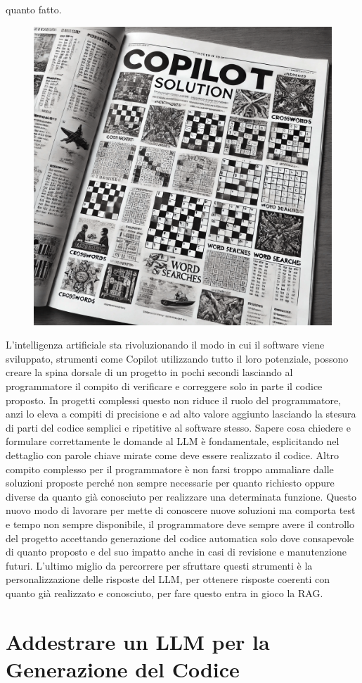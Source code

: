 \documentclass[12pt,a4paper,openright,twoside]{book}
\begin{document}
quanto fatto.
\begin{figure}[h]
    \centering
    \includegraphics[width=0.5\linewidth]{figures/copilotsolutionSettimanaEnigmistica.png}
    \label{fig:Copilot-Solution}
\end{figure}
\newline
L'intelligenza artificiale sta rivoluzionando il modo in cui il software viene sviluppato, strumenti come Copilot utilizzando tutto il loro potenziale, possono creare la spina dorsale di un progetto
in pochi secondi lasciando al programmatore il compito di verificare e correggere solo in parte il codice proposto. 
In progetti complessi questo non riduce il ruolo del programmatore, anzi lo eleva a compiti di precisione e ad alto valore aggiunto lasciando la stesura di parti del codice semplici e ripetitive al software stesso.
Sapere cosa chiedere e formulare correttamente le domande al LLM è fondamentale, esplicitando nel dettaglio con parole chiave mirate come deve essere realizzato il codice.
Altro compito complesso per il programmatore è non farsi troppo ammaliare dalle soluzioni proposte perché non sempre necessarie per quanto richiesto oppure diverse da quanto già conosciuto
 per realizzare una determinata funzione.
Questo nuovo modo di lavorare per mette di conoscere nuove soluzioni ma comporta test e tempo non sempre disponibile,
il programmatore deve sempre avere il controllo del progetto accettando generazione del codice automatica solo dove consapevole di quanto proposto e del suo impatto anche in casi di revisione e manutenzione futuri.
L'ultimo miglio da percorrere per sfruttare questi strumenti è la personalizzazione delle risposte del LLM, per ottenere risposte coerenti con quanto già realizzato e conosciuto, per fare questo entra in gioco la RAG.
\chapter{Addestrare un LLM per la Generazione del Codice}
\end{document}
